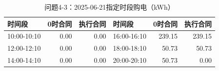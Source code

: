 \begin{table}[H]\centering\small\caption{问题4-3：2025-06-21指定时段购电（kWh）}\label{tab:q4_320250621p}
\begin{tabular}{lrrlrr}\toprule
时间段 & 0时合同 & 执行合同 & 时间段 & 0时合同 & 执行合同\\\midrule
10:00-10:10 & 0.00 & 0.00 & 16:00-16:10 & 239.15 & 239.15\\
12:00-12:10 & 0.00 & 0.00 & 18:00-18:10 & 50.73 & 50.73\\
14:00-14:10 & 0.00 & 0.00 & 20:00-20:10 & 50.73 & 0.00\\
\bottomrule\end{tabular}\end{table}
